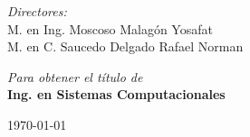 \documentclass[11pt]{report}
\begin{document}
\begin{center}
\begin{minipage}{0.46\textwidth}
\begin{flushleft}
\end{flushleft}
\end{minipage}
\begin{minipage}{0.52\textwidth}		
\vspace{-0.6cm}
\begin{flushright} \large
\emph{Directores:} \\
M. en Ing. Moscoso Malagón Yosafat\\
M. en C. Saucedo Delgado Rafael Norman
\end{flushright}
\end{minipage}
\vspace*{1cm}
\vspace{1cm}	
\emph{Para obtener el t\'itulo de }\\
\vspace{1cm}	
{\textbf{\Large Ing. en Sistemas Computacionales}	}\\
\vspace{1cm}
\begin{center}
{\large \today}
\end{center}											  						
\end{center}
\end{document}
